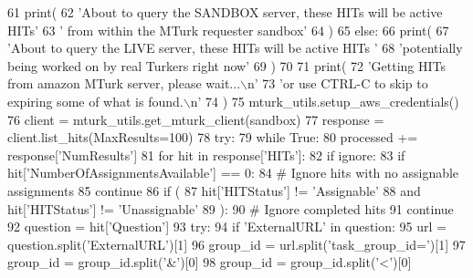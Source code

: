 \begin{DoxyCode}
61         print(
62             \textcolor{stringliteral}{'About to query the SANDBOX server, these HITs will be active HITs'}
63             \textcolor{stringliteral}{' from within the MTurk requester sandbox'}
64         )
65     \textcolor{keywordflow}{else}:
66         print(
67             \textcolor{stringliteral}{'About to query the LIVE server, these HITs will be active HITs '}
68             \textcolor{stringliteral}{'potentially being worked on by real Turkers right now'}
69         )
70 
71     print(
72         \textcolor{stringliteral}{'Getting HITs from amazon MTurk server, please wait...\(\backslash\)n'}
73         \textcolor{stringliteral}{'or use CTRL-C to skip to expiring some of what is found.\(\backslash\)n'}
74     )
75     mturk\_utils.setup\_aws\_credentials()
76     client = mturk\_utils.get\_mturk\_client(sandbox)
77     response = client.list\_hits(MaxResults=100)
78     \textcolor{keywordflow}{try}:
79         \textcolor{keywordflow}{while} \textcolor{keyword}{True}:
80             processed += response[\textcolor{stringliteral}{'NumResults'}]
81             \textcolor{keywordflow}{for} hit \textcolor{keywordflow}{in} response[\textcolor{stringliteral}{'HITs'}]:
82                 \textcolor{keywordflow}{if} ignore:
83                     \textcolor{keywordflow}{if} hit[\textcolor{stringliteral}{'NumberOfAssignmentsAvailable'}] == 0:
84                         \textcolor{comment}{# Ignore hits with no assignable assignments}
85                         \textcolor{keywordflow}{continue}
86                     \textcolor{keywordflow}{if} (
87                         hit[\textcolor{stringliteral}{'HITStatus'}] != \textcolor{stringliteral}{'Assignable'}
88                         \textcolor{keywordflow}{and} hit[\textcolor{stringliteral}{'HITStatus'}] != \textcolor{stringliteral}{'Unassignable'}
89                     ):
90                         \textcolor{comment}{# Ignore completed hits}
91                         \textcolor{keywordflow}{continue}
92                 question = hit[\textcolor{stringliteral}{'Question'}]
93                 \textcolor{keywordflow}{try}:
94                     \textcolor{keywordflow}{if} \textcolor{stringliteral}{'ExternalURL'} \textcolor{keywordflow}{in} question:
95                         url = question.split(\textcolor{stringliteral}{'ExternalURL'})[1]
96                         group\_id = url.split(\textcolor{stringliteral}{'task\_group\_id='})[1]
97                         group\_id = group\_id.split(\textcolor{stringliteral}{'&'})[0]
98                         group\_id = group\_id.split(\textcolor{stringliteral}{'<'})[0]

\end{DoxyCode}
